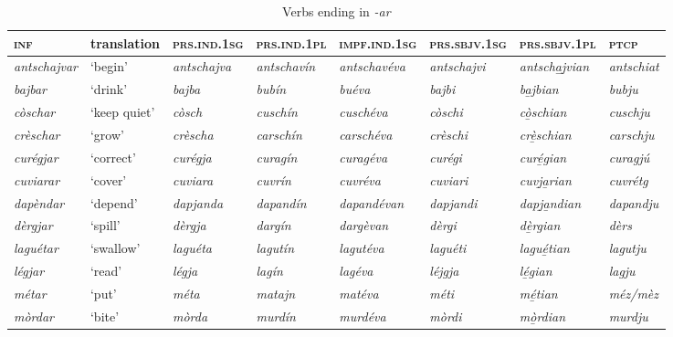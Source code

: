 \begin{sidewaystable} 
	\caption{Verbs ending in \textit{-ar}}
	\label{stemaltvar}
	\small
	\begin{tabularx}{\textwidth}{llllllll}
		\lsptoprule
		\textsc{\textbf{inf}} & \textbf{translation} & \textsc{\textbf{prs.ind.1sg}} & \textsc{\textbf{prs.ind.1pl}} & \textsc{\textbf{impf.ind.1sg}} & \textsc{\textbf{prs.sbjv.1sg}} & \textsc{\textbf{prs.sbjv.1pl}} & \textsc{\textbf{ptcp}}\\
		\midrule
		\textit{antschajvar} & `begin' & \textit{antschajva} & \textit{antschavín} & \textit{antschavéva} &  \textit{antschajvi} & \textit{antscha̱j̱vian} & \textit{antschiat}\\
		\textit{bajbar} & `drink' & \textit{bajba} & \textit{bubín} & \textit{buéva} & \textit{bajbi} & \textit{ba̲jbian} & \textit{bubju}\\
		\textit{còschar} & `keep quiet' & \textit{còsch} & \textit{cuschín} & \textit{cuschéva} & \textit{còschi} & \textit{cò̱schian} & \textit{cuschju}\\
		\textit{crèschar} & `grow' & \textit{crèscha} & \textit{carschín} & \textit{carschéva} & \textit{crèschi} & \textit{crè̱schian}  & \textit{carschju}\\
		\textit{curégjar} & `correct' & \textit{curégja} & \textit{curagín} & \textit{curagéva} & \textit{curégi} & \textit{curé̱gian} & \textit{curagjú}\\
		\textit{cuviarar} & `cover' & \textit{cuviara} & \textit{cuvrín} & \textit{cuvréva} & \textit{cuviari} & \textit{cuvj̱a̱rian} & \textit{cuvrétg}\\
		\textit{dapèndar} & `depend' & \textit{dapjanda} & \textit{dapandín} & \textit{dapandévan} & \textit{dapjandi} & \textit{dapj̱a̱ndian} & \textit{dapandju}\\
		\textit{dèrgjar} & `spill' & \textit{dèrgja} & \textit{dargín} & \textit{dargèvan} & \textit{dèrgi} & \textit{dè̱rgian}
		 & \textit{dèrs}\\
		\textit{laguétar} & `swallow' & \textit{laguéta} & \textit{lagutín} & \textit{lagutéva} & \textit{laguéti} & \textit{lagué̱tian} & \textit{lagutju}\\
		\textit{légjar} & `read' & \textit{légja} & \textit{lagín} & \textit{lagéva} & \textit{léjgja} & \textit{lé̱gian} & \textit{lagju}\\
		\textit{métar} & `put' & \textit{méta} & \textit{matajn} & \textit{matéva} & \textit{méti} & \textit{mé̱tian} & \textit{méz/mèz}\\
		\textit{mòrdar} & `bite' & \textit{mòrda} & \textit{murdín} & \textit{murdéva} & \textit{mòrdi} & \textit{mò̱rdian} & \textit{murdju}\\

\end{tabularx}
\end{sidewaystable}

